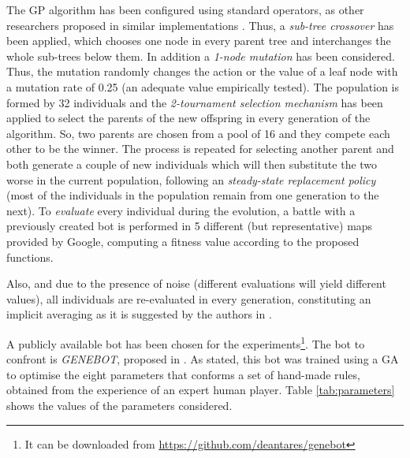 \documentclass[preprint]{elsarticle}
\begin{document}
The GP algorithm has been configured using standard operators, as other researchers proposed in similar implementations \cite{Esparcia2013GPunreal}. Thus, a \textit{sub-tree crossover} has been applied, which chooses one node in every parent tree and interchanges the whole sub-trees below them. In addition a \textit{1-node mutation} has been considered. Thus, the mutation randomly changes the action or the value of a leaf node with a mutation rate of 0.25 (an adequate value empirically tested). 
The population is formed by 32 individuals and the \textit{2-tournament selection mechanism} has been applied to select the parents of the new offspring in every generation of the algorithm. So, two parents are chosen from a pool of 16 and they compete each other to be the winner. The process is repeated for selecting another parent and both generate a couple of new individuals which will then substitute the two worse in the current population, following an \textit{steady-state replacement policy} (most of the individuals in the population remain from one generation to the next). 
To \textit{evaluate} every individual during the evolution, a battle with a previously created bot is performed in 5 different (but representative) maps provided by Google, computing a fitness value according to the proposed functions. 

Also, and due to the presence of noise (different evaluations will yield different values), all individuals are re-evaluated in every generation, constituting an implicit averaging as it is suggested by the authors in \cite{Jin2005303,DBLP:conf/ijcci/MereloLFGCCRMG15}.

A publicly available bot has been chosen for the
experiments\footnote{It can be downloaded from \url{https://github.com/deantares/genebot}}. 
The bot to confront is {\em GENEBOT}, proposed in \cite{Genebot_CEC11}. As stated, this bot was trained using a GA to optimise the eight parameters that conforms a set of hand-made rules, obtained from the experience of an expert human player. Table \ref{tab:parameters} shows the values of the parameters considered.
\end{document}
